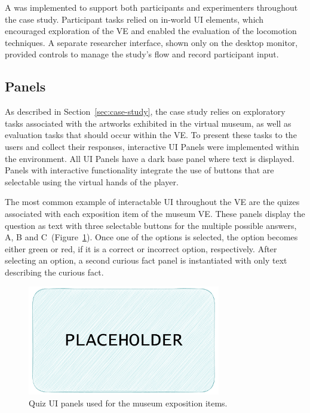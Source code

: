 A  was implemented to support both participants and experimenters throughout the case study. 
Participant tasks relied on in-world \gls{UI} elements, which encouraged exploration of the \gls{VE} and enabled 
the evaluation of the locomotion techniques. A separate researcher interface, shown only on the desktop monitor, 
provided controls to manage the study's flow and record participant input.


\subsection{Panels}
\label{sec:panels}

As described in Section~\ref{sec:case-study}, the case study relies on exploratory tasks associated 
with the artworks exhibited in the virtual museum, as well as evaluation tasks that should occur within the \gls{VE}. 
To present these tasks to the users and collect their responses, interactive \gls{UI} Panels were implemented within the environment.
All \gls{UI} Panels have a dark base panel where text is displayed. Panels with interactive functionality integrate the use of buttons that 
are selectable using the virtual hands of the player.

The most common example of interactable \gls{UI} throughout the \gls{VE} are the quizes associated with each exposition item of the museum \gls{VE}. 
These panels display the question as text with three selectable buttons for the multiple possible answers, A, B and C~(Figure~\ref{fig:quiz-panel}).
Once one of the options is selected, the option becomes either green or red, if it is a correct or incorrect option, respectively. After selecting 
an option, a second curious fact panel is instantiated with only text describing the curious fact.

\begin{figure}[t]
    \centering
     \includegraphics[width=0.75\textwidth]{NOVAthesisFiles/Images/placeholder.pdf}
     \caption[Quiz UI panels used for the museum exposition items.]
     {Quiz UI panels used for the museum exposition items.}
     \label{fig:quiz-panel}
\end{figure}

